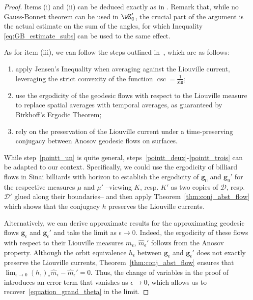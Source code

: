 \documentclass[reqno,11pt]{amsart}
\begin{document}
    \begin{proof}
        Items (i) and (ii) can be deduced exactly as in \cite[Proposition 4.3]{wilkinson_anosov}.
        Remark that, while no Gauss-Bonnet theorem can be used in \(\wK_0'\), the crucial part of the argument is the actual estimate on the sum of the angles, for which Inequality \eqref{eq:GB_estimate_subs} can be used to the same effect.
        \par As for item (iii), we can follow the steps outlined in~\cite[Proposition 4.5]{wilkinson_anosov}, which are as follows:
        \begin{enumerate}[label=\alph*.]
            \item\label{pointt_un} apply Jensen’s Inequality when averaging against the Liouville current, leveraging the strict convexity of the function $\csc=\frac{1}{\sin}$;
            \item\label{pointt_deux} use the ergodicity of the geodesic flows with respect to the Liouville measure to replace spatial averages with temporal averages, as guaranteed by Birkhoff’s Ergodic Theorem;
            \item\label{pointt_trois} rely on the preservation of the Liouville current under a time-preserving conjugacy between Anosov geodesic flows on surfaces. 
        \end{enumerate} 
        While step~\ref{pointt_un} is quite general, steps~\ref{pointt_deux}-\ref{pointt_trois} can be adapted to our context. Specifically, we could use the ergodicity of billiard flows in Sinai billiards with horizon to establish the ergodicity of $\mathbf{g}_0$ and $\mathbf{g}_0'$ for the respective measures $\mu$ and $\mu'$ --viewing $K$, resp. $K'$ as two copies of $\mathcal{D}$, resp. $\mathcal{D}'$ glued along their boundaries-- and then apply Theorem~\ref{thm:conj_abst_flow} which shows that the conjugacy $h$ preserves the Liouville currents. 

        Alternatively, we can derive approximate results for the approximating geodesic flows \(\mathbf{g}_\epsilon\) and \(\mathbf{g}_\epsilon'\) and take the limit as $\epsilon\to 0$. Indeed, the ergodicity of these flows with respect to their Liouville measures $\widehat{m}_\epsilon$, $\widehat{m}_\epsilon'$ follows from the Anosov property. Although the orbit equivalence $h_\epsilon$ between \(\mathbf{g}_\epsilon\) and \(\mathbf{g}_\epsilon'\) does not exactly preserve the Liouville currents,  Theorem~\ref{thm:conj_abst_flow} ensures that $\lim_{\epsilon\to 0}(h_\epsilon)_* \widehat{m}_\epsilon-\widehat{m}_\epsilon'=0$. Thus, the change of variables in the proof of~\cite[Proposition 4.5]{wilkinson_anosov} introduces an error term that vanishes as $\epsilon\to 0$, which allows us to recover~\eqref{equation_grand_theta} in the limit. 
    \end{proof}
\end{document}
